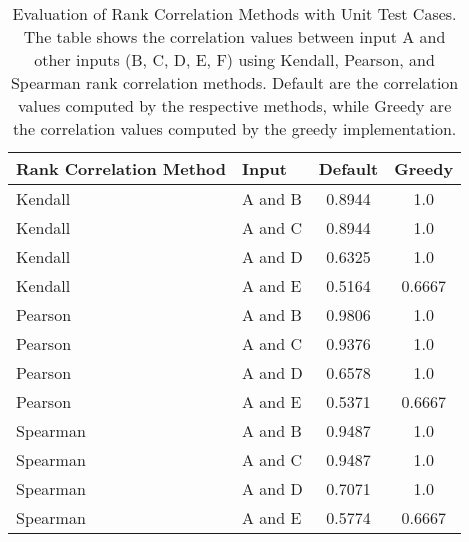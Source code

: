 \begin{table}[h!]
    \centering
    \caption{Evaluation of Rank Correlation Methods with Unit Test Cases. The table shows the correlation values between input A and other inputs (B, C, D, E, F) using Kendall, Pearson, and Spearman rank correlation methods. Default are the correlation values computed by the respective methods, while Greedy are the correlation values computed by the greedy implementation.}
    \begin{tabular}{@{}llcc@{}}
        \toprule
        \textbf{Rank Correlation Method} & \textbf{Input} & \textbf{Default} & \textbf{Greedy} \\ \midrule
        Kendall                        & A and B                   & 0.8944                          & 1.0                            \\
        Kendall                        & A and C                   & 0.8944                          & 1.0                            \\
        Kendall                        & A and D                   & 0.6325                          & 1.0                            \\
        Kendall                        & A and E                   & 0.5164                          & 0.6667                         \\ \midrule
        Pearson                        & A and B                   & 0.9806                          & 1.0                            \\
        Pearson                        & A and C                   & 0.9376                          & 1.0                            \\
        Pearson                        & A and D                   & 0.6578                          & 1.0                            \\
        Pearson                        & A and E                   & 0.5371                          & 0.6667                         \\ \midrule
        Spearman                       & A and B                   & 0.9487                          & 1.0                            \\
        Spearman                       & A and C                   & 0.9487                          & 1.0                            \\
        Spearman                       & A and D                   & 0.7071                          & 1.0                            \\
        Spearman                       & A and E                   & 0.5774                          & 0.6667                         \\ \bottomrule
    \end{tabular}
\end{table}

